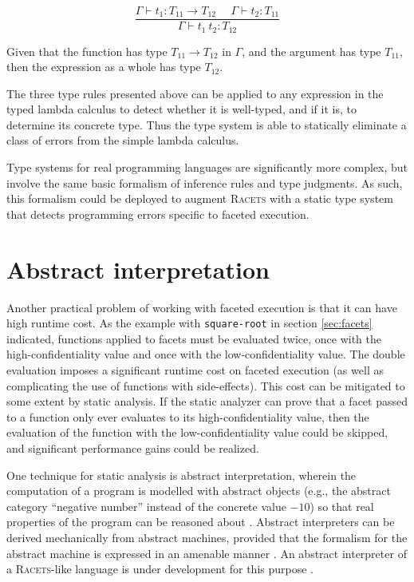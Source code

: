 \documentclass{article}
\begin{document}
\[
\frac{\Gamma \vdash t_1 : T_{11} \to T_{12}\ \ \ \ \ \ \Gamma \vdash t_2 : T_{11}}
{\Gamma \vdash t_1\ t_2 : T_{12}}
\]

Given that the function has type $T_{11} \to T_{12}$ in $\Gamma$, and the argument has type $T_{11}$, then the expression as a whole has type $T_{12}$.

The three type rules presented above can be applied to any expression in the typed lambda calculus to detect whether it is well-typed, and if it is, to determine its concrete type. Thus the type system is able to statically eliminate a class of errors from the simple lambda calculus.

Type systems for real programming languages are significantly more complex, but involve the same basic formalism of inference rules and type judgments. As such, this formalism could be deployed to augment \textsc{Racets} with a static type system that detects programming errors specific to faceted execution.



\section{Abstract interpretation}
Another practical problem of working with faceted execution is that it can have high runtime cost. As the example with \texttt{square-root} in section \ref{sec:facets} indicated, functions applied to facets must be evaluated twice, once with the high-confidentiality value and once with the low-confidentiality value. The double evaluation imposes a significant runtime cost on faceted execution (as well as complicating the use of functions with side-effects). This cost can be mitigated to some extent by static analysis. If the static analyzer can prove that a facet passed to a function only ever evaluates to its high-confidentiality value, then the evaluation of the function with the low-confidentiality value could be skipped, and significant performance gains could be realized.

One technique for static analysis is abstract interpretation, wherein the computation of a program is modelled with abstract objects (e.g., the abstract category ``negative number'' instead of the concrete value $-10$) so that real properties of the program can be reasoned about \cite{ai-original}. Abstract interpreters can be derived mechanically from abstract machines, provided that the formalism for the abstract machine is expressed in an amenable manner \cite{aam}. An abstract interpreter of a \textsc{Racets}-like language is under development for this purpose \cite{abstract-inter}.
\end{document}
